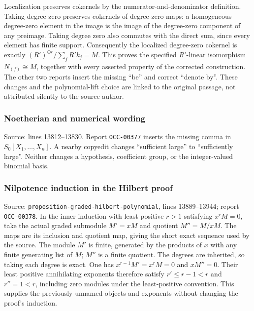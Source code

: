 Localization preserves cokernels by the numerator-and-denominator definition. Taking degree zero preserves cokernels of degree-zero maps: a homogeneous degree-zero element in the image is the image of the degree-zero component of any preimage. Taking degree zero also commutes with the direct sum, since every element has finite support. Consequently the localized degree-zero cokernel is exactly \((R')^{\oplus r}/\sum_j R'k_j=M\). This proves the specified \(R'\)-linear isomorphism \(N_{(f)}\cong M\), together with every asserted property of the corrected construction. The other two reports insert the missing ``be'' and correct ``denote by''. These changes and the polynomial-lift choice are linked to the original passage, not attributed silently to the source author.

\subsubsection{Noetherian and numerical wording}\label{algebra-proof-002-noetherian-and-numerical-wording}

Source: lines 13812--13830. Report \texttt{OCC-00377} inserts the missing comma in \(S_0[X_1,\ldots,X_n]\). A nearby copyedit changes ``sufficient large'' to ``sufficiently large''. Neither changes a hypothesis, coefficient group, or the integer-valued binomial basis.

\subsubsection{Nilpotence induction in the Hilbert proof}\label{algebra-proof-002-nilpotence-induction-in-the-hilbert-proof}

Source: \texttt{proposition-graded-hilbert-polynomial}, lines 13889--13944; report \texttt{OCC-00378}. In the inner induction with least positive \(r>1\) satisfying \(x^rM=0\), take the actual graded submodule \(M'=xM\) and quotient \(M''=M/xM\). The maps are its inclusion and quotient map, giving the short exact sequence used by the source. The module \(M'\) is finite, generated by the products of \(x\) with any finite generating list of \(M\); \(M''\) is a finite quotient. The degrees are inherited, so taking each degree is exact. One has \(x^{r-1}M'=x^rM=0\) and \(xM''=0\). Their least positive annihilating exponents therefore satisfy \(r'\leq r-1<r\) and \(r''=1<r\), including zero modules under the least-positive convention. This supplies the previously unnamed objects and exponents without changing the proof's induction.

